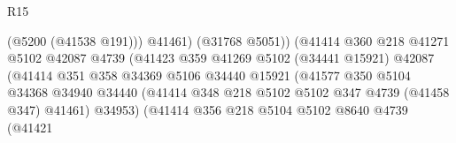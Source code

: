 \begin{lexlean}{R15}
\begin{coremodule}
{{{{{{{{{{{                                                (@5200 (@41538 @191)))
                                              @41461)
                                            (@31768 @5051))
                                          (@41414
                                            @360
                                            @218
                                            @41271
                                            @5102
                                            @42087
                                            @4739
                                            (@41423
                                              @359
                                              @41269
                                              @5102
                                              (@34441 @15921)
                                              @42087
                                              (@41414
                                                @351
                                                @358
                                                @34369
                                                @5106
                                                @34440
                                                @15921
                                                (@41577
                                                  @350
                                                  @5104
                                                  @34368
                                                  @34940
                                                  @34440
                                                  (@41414
                                                    @348
                                                    @218
                                                    @5102
                                                    @5102
                                                    @347
                                                    @4739
                                                    (@41458 @347)
                                                    @41461)
                                                  @34953)
                                                (@41414
                                                  @356
                                                  @218
                                                  @5104
                                                  @5102
                                                  @8640
                                                  @4739
                                                  (@41421
}}}}}}}}}}}
\end{coremodule}
\end{lexlean}
